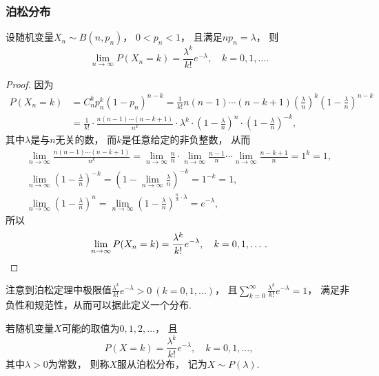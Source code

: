 \subsubsection{泊松分布}
\begin{theorem}[泊松定理]\label{theorem:泊松分布.泊松定理}
设随机变量\(X_n \sim B(n,p_n)\)，
\(0 < p_n < 1\)，
且满足\(n p_n = \lambda\)，
则\begin{equation}
	\lim_{n\to\infty} P(X_n=k)
	= \frac{\lambda^k}{k!} e^{-\lambda},
	\quad k=0,1,\dotsc.
\end{equation}
\begin{proof}
因为\begin{align*}
	P(X_n=k) &= C_n^k p_n^k (1-p_n)^{n-k}
	= \frac{1}{k!} n(n-1)\dotsm(n-k+1)
	\left(\frac{\lambda}{n}\right)^k
	\left(1-\frac{\lambda}{n}\right)^{n-k} \\
	&= \frac{1}{k!}
	\cdot \frac{n(n-1)\dotsm(n-k+1)}{n^k}
	\cdot \lambda^k
	\cdot \left(1-\frac{\lambda}{n}\right)^n
	\cdot \left(1-\frac{\lambda}{n}\right)^{-k},
\end{align*}
其中\(\lambda\)是与\(n\)无关的数，
而\(k\)是任意给定的非负整数，
从而\begin{gather*}
	\lim_{n\to\infty} \frac{n(n-1)\dotsm(n-k+1)}{n^k}
	= \lim_{n\to\infty} \frac{n}{n}
	\cdot \lim_{n\to\infty} \frac{n-1}{n}
	\dotsm \lim_{n\to\infty} \frac{n-k+1}{n}
	= 1^k = 1, \\
	\lim_{n\to\infty} \left(1-\frac{\lambda}{n}\right)^{-k}
	= \left(1-\lim_{n\to\infty} \frac{\lambda}{n}\right)^{-k}
	= 1^{-k} = 1, \\
	\lim_{n\to\infty} \left(1-\frac{\lambda}{n}\right)^n
	= \lim_{n\to\infty}
	\left(1-\frac{\lambda}{n}\right)^{\frac{n}{\lambda} \cdot \lambda}
	= e^{-\lambda},
\end{gather*}
所以\begin{equation*}
	\lim_{n\to\infty} P(X_n=k)
	= \frac{\lambda^k}{k!} e^{-\lambda},
	\quad k=0,1,\dotsc.
	\qedhere
\end{equation*}
\end{proof}
\end{theorem}

注意到泊松定理中极限值\(\frac{\lambda^k}{k!} e^{-\lambda} > 0\ (k=0,1,\dotsc)\)，
且\(\sum_{k=0}^\infty \frac{\lambda^k}{k!} e^{-\lambda} = 1\)，
满足非负性和规范性，从而可以据此定义一个分布.

\begin{definition}
若随机变量\(X\)可能的取值为\(0,1,2,\dotsc\)，
且\begin{equation}\label{equation:离散型分布.泊松分布的分布律}
	P(X=k) = \frac{\lambda^k}{k!} e^{-\lambda},
	\quad k=0,1,\dotsc,
\end{equation}
其中\(\lambda > 0\)为常数，
则称\(X\)服从泊松分布，
记为\(X \sim P(\lambda)\).
\end{definition}

